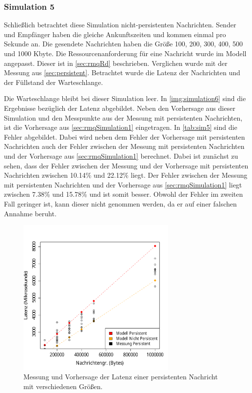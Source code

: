 \subsubsection{Simulation 5}
Schließlich betrachtet diese Simulation nicht-persistenten Nachrichten. Sender und Empfänger haben die gleiche Ankunftszeiten und kommen einmal pro Sekunde an. Die gesendete Nachrichten haben die Größe 100, 200, 300, 400, 500 und 1000 Kbyte. Die Ressourcenanforderung für eine Nachricht wurde im Modell angepasst. Dieser ist in \autoref{sec:rmqRd} beschrieben. Verglichen wurde mit der Messung aus \autoref{sec:persistent}. Betrachtet wurde die Latenz der Nachrichten und der Füllstand der Warteschlange. \par
Die Warteschlange bleibt bei dieser Simulation leer. In \autoref{img:simulation6} sind die Ergebnisse bezüglich der Latenz abgebildet. Neben den Vorhersage aus dieser Simulation und den Messpunkte aus der Messung mit persistenten Nachrichten, ist die Vorhersage aus \autoref{sec:rmqSimulation1} eingetragen. In \autoref{tab:sim5} sind die Fehler abgebildet. Dabei wird neben dem Fehler der Vorhersage mit persistenten Nachrichten auch der Fehler zwischen der Messung mit persistenten Nachrichten und der Vorhersage aus \autoref{sec:rmqSimulation1} berechnet. Dabei ist zunächst zu sehen, dass der Fehler zwischen der Messung und der Vorhersage mit persistenten Nachrichten zwischen 10.14\% und 22.12\% liegt. Der Fehler zwischen der Messung mit persistenten Nachrichten und der Vorhersage aus \autoref{sec:rmqSimulation1} liegt zwischen 7.38\% und 15.78\% und ist somit besser. Obwohl der Fehler im zweiten Fall geringer ist, kann dieser nicht genommen werden, da er auf einer falschen Annahme beruht.
\begin{figure}
\center
  \includegraphics[width=0.7\textwidth]{images/modelSimulationResults/simulation6.pdf}
  \caption{Messung und Vorhersage der Latenz einer persistenten Nachricht mit verschiedenen Größen.}
  \label{img:simulation6}
\end{figure}

